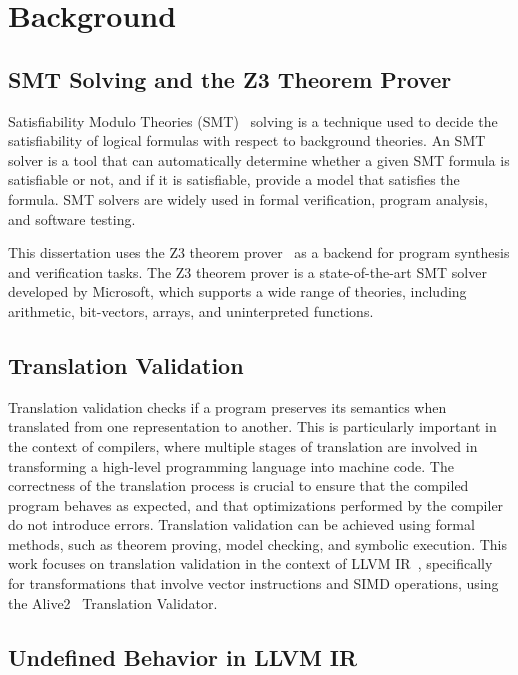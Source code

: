 \chapter{Background}
\label{chap:background}

\section {SMT Solving and the Z3 Theorem Prover}

Satisfiability Modulo Theories (SMT)~\cite{barrett2018satisfiability}
solving is a technique used to decide the satisfiability of logical
formulas with respect to background theories.
%
An SMT solver is a tool that can automatically determine whether a
given SMT formula is satisfiable or not, and if it is satisfiable,
provide a model that satisfies the formula.
%
SMT solvers are widely used in formal verification, program analysis,
and software testing.

This dissertation uses the Z3 theorem prover~\cite{z3} as a backend
for program synthesis and verification tasks.
%
The Z3 theorem prover is a state-of-the-art SMT solver developed by
Microsoft, which supports a wide range of theories, including
arithmetic, bit-vectors, arrays, and uninterpreted functions.

\section {Translation Validation}

Translation validation checks if a program preserves its semantics
when translated from one representation to another.
%
This is particularly important in the context of compilers,
where multiple stages of translation are involved in transforming a
high-level programming language into machine code.
%
The correctness of the translation process is crucial to ensure that
the compiled program behaves as expected, and that optimizations
performed by the compiler do not introduce errors.
%
Translation validation can be achieved using formal methods, such as
theorem proving, model checking, and symbolic execution.
%
This work focuses on translation validation in the context of LLVM
IR~\cite{LLVM:CGO04}, specifically for transformations that involve
vector instructions and SIMD operations, using the
Alive2~\cite{alive2} Translation Validator.

\section {Undefined Behavior in LLVM IR}


